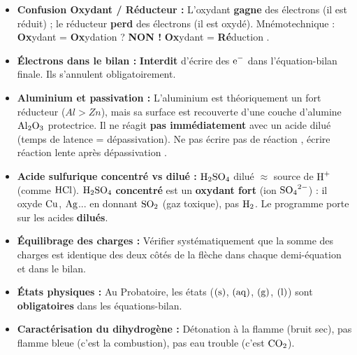 \documentclass[11pt]{article}
\begin{document}
\begin{attention}
\begin{itemize}
  \item \textbf{Confusion Oxydant / Réducteur :} L'oxydant \textbf{gagne} des électrons (il est réduit) ; le réducteur \textbf{perd} des électrons (il est oxydé). Mnémotechnique : \og \textbf{Ox}ydant = \textbf{Ox}ydation ? \textbf{NON !} \textbf{Ox}ydant = \textbf{Ré}duction \fg.
  \item \textbf{Électrons dans le bilan :} \textbf{Interdit} d'écrire des $\ce{e^-}$ dans l'équation-bilan finale. Ils s'annulent obligatoirement.
  \item \textbf{Aluminium et passivation :} L'aluminium est théoriquement un fort réducteur ($Al > Zn$), mais sa surface est recouverte d'une couche d'alumine $\ce{Al2O3}$ protectrice. Il ne réagit \textbf{pas immédiatement} avec un acide dilué (temps de latence = dépassivation). Ne pas écrire \og pas de réaction \fg, écrire \og réaction lente après dépassivation \fg.
  \item \textbf{Acide sulfurique concentré vs dilué :} $\ce{H2SO4}$ dilué $\approx$ source de $\ce{H+}$ (comme $\ce{HCl}$). $\ce{H2SO4}$ \textbf{concentré} est un \textbf{oxydant fort} (ion $\ce{SO4^2-}$) : il oxyde $\ce{Cu}$, $\ce{Ag}$... en donnant $\ce{SO2}$ (gaz toxique), pas $\ce{H2}$. Le programme porte sur les acides \textbf{dilués}.
  \item \textbf{Équilibrage des charges :} Vérifier systématiquement que la somme des charges est identique des deux côtés de la flèche dans chaque demi-équation et dans le bilan.
  \item \textbf{États physiques :} Au Probatoire, les états ($\ce{(s)}$, $\ce{(aq)}$, $\ce{(g)}$, $\ce{(l)}$) sont \textbf{obligatoires} dans les équations-bilan.
  \item \textbf{Caractérisation du dihydrogène :} \og Détonation à la flamme \fg (bruit sec), pas \og flamme bleue \fg (c'est la combustion), pas \og eau trouble \fg (c'est $\ce{CO2}$).
\end{itemize}
\end{attention}
\end{document}
